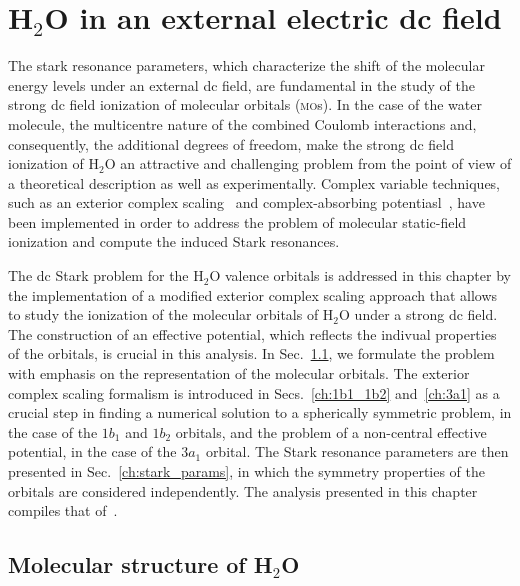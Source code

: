\chapter{H$_{2}$O in an external electric dc field}
\label{cha:dc_h2o}


The stark resonance parameters, which characterize the shift of the
molecular energy levels under an external dc field, are fundamental in
the study of the strong dc field ionization of molecular orbitals
(\textsc{mo}s). In the case of the water molecule, the multicentre
nature of the combined Coulomb interactions and, consequently, the
additional degrees of freedom, make the strong dc field ionization of
H$_{2}$O an attractive and challenging problem from the point of view
of a theoretical description as well as experimentally. Complex
variable techniques, such as an exterior complex
scaling~\cite{Simon_1979,Scrinzi_2010} and complex-absorbing
potentiasl~\cite{RissMeyer_1993,Krause_2014}, have been implemented in
order to address the problem of molecular static-field ionization and
compute the induced Stark resonances.

The dc Stark problem for the H$_{2}$O valence orbitals is addressed in
this chapter by the implementation of a modified exterior complex
scaling approach that allows to study the ionization of the molecular
orbitals of H$_{2}$O under a strong dc field. The construction of an
effective potential, which reflects the indivual properties of the
orbitals, is crucial in this analysis. In Sec.~\ref{ch:h2o_structure},
we formulate the problem with emphasis on the representation of the
molecular orbitals. The exterior complex scaling formalism is
introduced in Secs.~\ref{ch:1b1_1b2} and~\ref{ch:3a1} as a crucial
step in finding a numerical solution to a spherically symmetric
problem, in the case of the $1b_{1}$ and $1b_{2}$ orbitals, and the
problem of a non-central effective potential, in the case of the
$3a_{1}$ orbital. The Stark resonance parameters are then presented in
Sec.~\ref{ch:stark_params}, in which the symmetry properties of the
orbitals are considered independently. The analysis presented in this
chapter compiles that of~\cite{sarias_2016,sarias_2017}.


\section{Molecular structure of H$_{2}$O}
\label{ch:h2o_structure}

